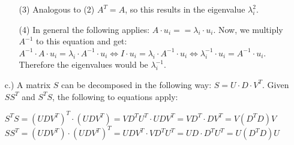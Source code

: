 \documentclass[%
   10pt,              %
   a4paper,           %
   DIV10,             %
]{scrartcl}%
\begin{document}
\begin{itemize}
\begin{enumerate}
		\item[(3)] Analogous to (2) $A^T = A$, so this results in the eigenvalue $\lambda_i^2$. 
		\item[(4)] In general the following applies: $A \cdot u_i = = \lambda_i \cdot u_i$. Now, we multiply $A^{-1}$ to this equation and get: $A^{-1} \cdot A \cdot u_i = \lambda_i \cdot A^{-1} \cdot u_i \Leftrightarrow I \cdot u_i = \lambda_i \cdot A^{-1} \cdot u_i \Leftrightarrow \lambda_i^{-1} \cdot u_i = A^{-1}\cdot u_i$. Therefore the eigenvalues would be $\lambda_i^{-1}$. 
	\end{enumerate}
	\item[c.)] A matrix $S$ can be decomposed in the following way: $S = U \cdot D \cdot V^T$. Given $SS^T$ and $S^TS$, the following to equations apply:\newline
	
	\noindent $S^TS = (UDV^T)^T \cdot (UDV^T) = VD^TU^T \cdot UDV^T = VD^T \cdot DV^T = V (D^TD) V$\newline
	\noindent $SS^T = (UDV^T) \cdot (UDV^T)^T = UDV^T \cdot VD^TU^T = UD \cdot D^TU^T = U (D^TD) U$
\end{itemize}
\end{document}

